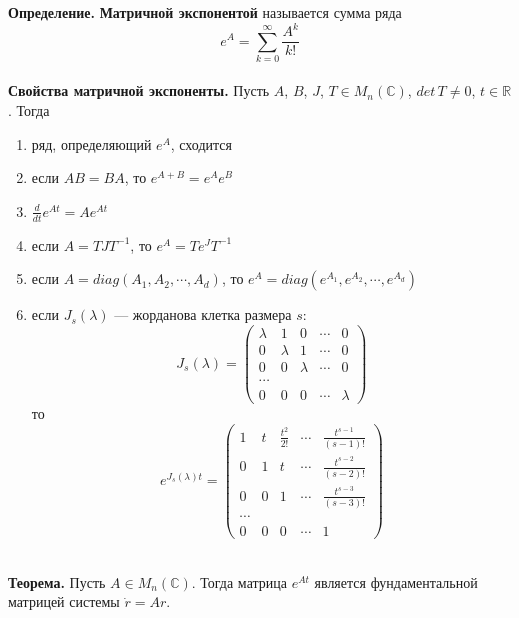 \documentclass{article}
\begin{document}
\noindent \textbf{Определение.} \textbf{Матричной экспонентой} называется сумма ряда
\begin{equation*}
    e^{A} = \sum_{k = 0}^{\infty} \frac{A^k}{k!}
\end{equation*}
\\
\noindent \textbf{Свойства матричной экспоненты.} Пусть $A$, $B$, $J$, $T \in M_n(\mathbb{C})$, $det\, T \neq 0$, $t \in \mathbb{R}$. Тогда
\begin{enumerate}
    \item ряд, определяющий $e^A$, сходится
    \item если $AB = BA$, то $e^{A+B} = e^{A}e^{B}$
    \item $\frac{d}{dt}e^{At} = Ae^{At}$
    \item если $A = TJT^{-1}$, то $e^A = Te^JT^{-1}$
    \item если $A = diag(A_1, A_2, \cdots, A_d)$, то $e^A = diag(e^{A_1}, e^{A_2}, \cdots, e^{A_d})$
    \item если $J_s(\lambda)$ --- жорданова клетка размера $s$:
    \begin{equation*}
        J_s(\lambda) = \begin{pmatrix}
            \lambda & 1 & 0 & \cdots & 0\\
            0 & \lambda & 1 & \cdots & 0\\
            0 & 0 & \lambda & \cdots & 0\\
            \cdots\\
            0 & 0 & 0 & \cdots & \lambda
        \end{pmatrix}
    \end{equation*}
    то
    \begin{equation*}
        e^{J_s(\lambda)t} = \begin{pmatrix}
        1 & t & \frac{t^2}{2!} & \cdots & \frac{t^{s-1}}{(s-1)!}\\
        0 & 1 & t & \cdots & \frac{t^{s-2}}{(s-2)!}\\
        0 & 0 & 1 & \cdots & \frac{t^{s-3}}{(s-3)!}\\
        \cdots\\
        0 & 0 & 0 & \cdots & 1
        \end{pmatrix}
    \end{equation*}
\end{enumerate}
\\
\noindent \textbf{Теорема.} Пусть $A \in M_n(\mathbb{C})$. Тогда матрица $e^{At}$ является фундаментальной матрицей системы $\dot{r} = Ar$.\\
\end{document}

